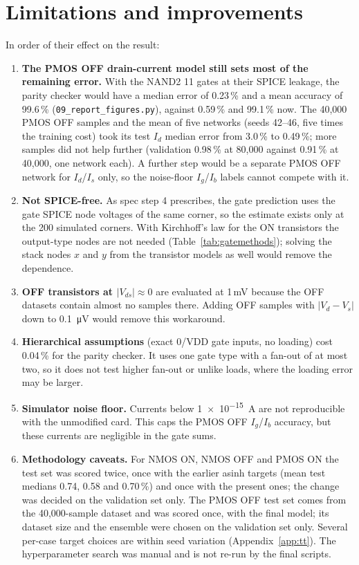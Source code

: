 \documentclass[11pt,a4paper]{article}
\begin{document}
\section{Limitations and improvements}
In order of their effect on the result:
\begin{enumerate}
  \item \textbf{The PMOS OFF drain-current model still sets most of the remaining error.} With the NAND2 11
        gates at their SPICE leakage, the parity checker would have a median error of 0.23\,\% and a mean
        accuracy of 99.6\,\% (\texttt{09\_report\_figures.py}), against 0.59\,\% and 99.1\,\% now. The 40,000
        PMOS OFF samples and the mean of five networks (seeds 42--46, five times the training cost) took its
        test $I_d$ median error from 3.0\,\% to 0.49\,\%; more samples did not help further (validation
        0.98\,\% at 80,000 against 0.91\,\% at 40,000, one network each). A further step would be a separate
        PMOS OFF network for $I_d$/$I_s$ only, so the noise-floor $I_g$/$I_b$ labels cannot compete with it.
  \item \textbf{Not SPICE-free.} As spec step 4 prescribes, the gate prediction uses the gate SPICE node
        voltages of the same corner, so the estimate exists only at the 200 simulated corners. With
        Kirchhoff's law for the ON transistors the output-type nodes are not needed
        (Table~\ref{tab:gatemethods}); solving the stack nodes $x$ and $y$ from the transistor models as
        well would remove the dependence.
  \item \textbf{OFF transistors at $|V_{ds}| \approx 0$} are evaluated at 1\,mV because the OFF datasets
        contain almost no samples there. Adding OFF samples with $|V_d - V_s|$ down to \SI{0.1}{\micro V}
        would remove this workaround.
  \item \textbf{Hierarchical assumptions} (exact 0/VDD gate inputs, no loading) cost 0.04\,\% for the
        parity checker. It uses one gate type with a fan-out of at most two, so it does not test higher
        fan-out or unlike loads, where the loading error may be larger.
  \item \textbf{Simulator noise floor.} Currents below \SI{1e-15}{A} are not reproducible with the
        unmodified card. This caps the PMOS OFF $I_g$/$I_b$ accuracy, but these currents are negligible in
        the gate sums.
  \item \textbf{Methodology caveats.} For NMOS ON, NMOS OFF and PMOS ON the test set was scored twice, once
        with the earlier asinh targets (mean test medians 0.74, 0.58 and 0.70\,\%) and once with the present
        ones; the change was decided on the validation set only. The PMOS OFF test set comes from the
        40,000-sample dataset and was scored once, with the final model; its dataset size and the ensemble
        were chosen on the validation set only. Several per-case target
        choices are within seed variation (Appendix~\ref{app:tt}). The hyperparameter search was manual and
        is not re-run by the final scripts.
\end{enumerate}
\end{document}
